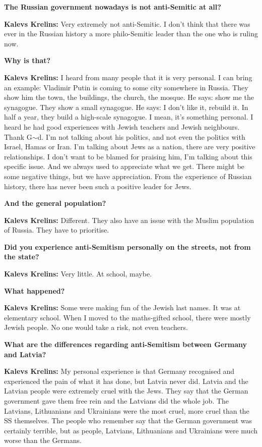\textbf{The Russian government nowadays is not anti-Semitic at all?} 

\textbf{Kalevs Krelins:} Very extremely not anti-Semitic. I don’t think that there was ever in the Russian history a more philo-Semitic leader than the one who is ruling now.  

\textbf{Why is that?} 
 
\textbf{Kalevs Krelins:} I heard from many people that it is very personal. I can bring an example: Vladimir Putin is coming to some city somewhere in Russia. They show him the town, the buildings, the church, the mosque. He says: show me the synagogue. They show a small synagogue. He says: I don’t like it, rebuild it. In half a year, they build a high-scale synagogue. I mean, it's something personal. I heard he had good experiences with Jewish teachers and Jewish neighbours. Thank G$\sim$d. I’m not talking about his politics, and not even the politics with Israel, Hamas or Iran. I’m talking about Jews as a nation, there are very positive relationships. I don’t want to be blamed for praising him, I’m talking about this specific issue. And we always used to appreciate what we get. There might be some negative things, but we have appreciation. From the experience of Russian history, there has never been such a positive leader for Jews.    

\textbf{And the general population?} 

\textbf{Kalevs Krelins:} Different. They also have an issue with the Muslim population of Russia. They have to prioritise. 

\textbf{Did you experience anti-Semitism personally on the streets, not from the state?}  

\textbf{Kalevs Krelins:} Very little. At school, maybe.  

\textbf{What happened?} 

\textbf{Kalevs Krelins:} Some were making fun of the Jewish last names. It was at elementary school. When I moved to the maths-gifted school, there were mostly Jewish people. No one would take a risk, not even teachers. 

\textbf{What are the differences regarding anti-Semitism between Germany and Latvia?}  

\textbf{Kalevs Krelins:} My personal experience is that Germany recognised and experienced the pain of what it has done, but Latvia never did. Latvia and the Latvian people were extremely cruel with the Jews. They say that the German government gave them free rein and the Latvians did the whole job. The Latvians, Lithuanians and Ukrainians were the most cruel, more cruel than the SS themselves. The people who remember say that the German government was certainly terrible, but as people, Latvians, Lithuanians and Ukrainians were much worse than the Germans.  

